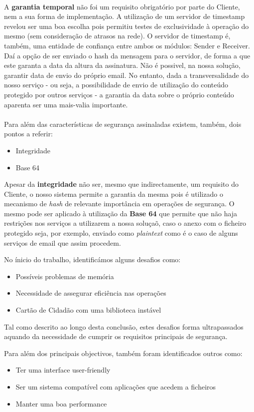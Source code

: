 \\
A \textbf{garantia temporal} não foi um requisito obrigatório por parte do Cliente, nem a sua forma de implementação. A utilização de um servidor de timestamp revelou ser uma boa escolha pois permitiu testes de exclusividade à operação do mesmo (sem consideração de atrasos na rede).
O servidor de timestamp é, também, uma entidade de confiança entre ambos os módulos: Sender e Receiver. Daí a opção de ser enviado o hash da mensagem para o servidor, de forma a que este garanta a data da altura da assinatura.
Não é possivel, na nossa solução, garantir data de envio do próprio email. No entanto, dada a transversalidade do nosso serviço - ou seja, a possibilidade de envio de utilização do conteúdo protegido por outros serviços - a garantia da data sobre o próprio conteúdo aparenta ser uma mais-valia importante. \\
\\
Para além das características de segurança assinaladas existem, também, dois pontos a referir:
\begin{itemize}
\item Integridade
\item Base 64
\end{itemize}

Apesar da \textbf{integridade} não ser, mesmo que indirectamente, um requisito do Cliente, o nosso sistema permite a garantia da mesma pois é utilizado o mecanismo de \textit{hash} de relevante importância em operações de segurança.
O mesmo pode ser aplicado à utilização da \textbf{Base 64} que permite que não haja restrições nos serviços a utilizarem a nossa soluçaõ, caso o anexo com o ficheiro protegido seja, por exemplo, enviado como \textit{plaintext} como é o caso de alguns serviços de email que assim procedem.

No ínicio do trabalho, identificámos alguns desafios como:
\begin{itemize}
\item Possíveis problemas de memória
\item Necessidade de assegurar eficiência nas operações
\item Cartão de Cidadão com uma biblioteca instável
\end{itemize}
Tal como descrito ao longo desta conclusão, estes desafios forma ultrapassados aquando da necessidade de cumprir os requisitos principais de segurança.

Para além dos principais objectivos, também foram identificados outros como:
\begin{itemize}
\item Ter uma interface user-friendly
\item Ser um sistema compatível com aplicações que acedem a ficheiros
\item Manter uma boa performance
\end{itemize}

